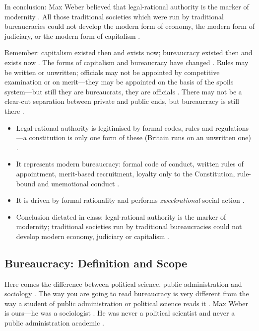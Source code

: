 \begin{KeyConcept}
In conclusion: Max Weber believed that legal-rational authority is the marker of modernity .
All those traditional societies which were run by traditional bureaucracies could not develop the modern form of economy, the modern form of judiciary, or the modern form of capitalism .
\end{KeyConcept}

\begin{CriticalPoint}
Remember: capitalism existed then and exists now; bureaucracy existed then and exists now . The forms of capitalism and bureaucracy have changed .
Rules may be written or unwritten; officials may not be appointed by competitive examination or on merit---they may be appointed on the basis of the spoils system---but still they are bureaucrats, they are officials .
There may not be a clear-cut separation between private and public ends, but bureaucracy is still there .
\end{CriticalPoint}

\begin{QuickRevision}
\begin{itemize}
    \item Legal-rational authority is legitimised by formal codes, rules and regulations---a constitution is only one form of these (Britain runs on an unwritten one) .
    \item It represents modern bureaucracy: formal code of conduct, written rules of appointment, merit-based recruitment, loyalty only to the Constitution, rule-bound and unemotional conduct .
    \item It is driven by formal rationality and performs \textit{zweckrational} social action .
    \item Conclusion dictated in class: legal-rational authority is the marker of modernity; traditional societies run by traditional bureaucracies could not develop modern economy, judiciary or capitalism .
\end{itemize}
\end{QuickRevision}

\subsection{Bureaucracy: Definition and Scope}
Here comes the difference between political science, public administration and sociology . The way you are going to read bureaucracy is very different from the way a student of public administration or political science reads it . Max Weber is ours---he was a sociologist . He was never a political scientist and never a public administration academic .


